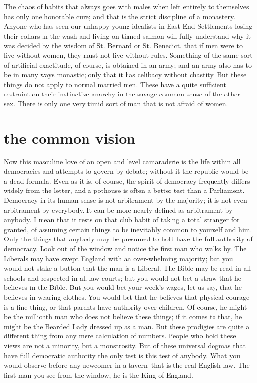 \documentclass[final,10pt,letterpaper,twocolumn,openany]{book}
\begin{document}
The chaos of habits that
always goes with males when left entirely to themselves has only one
honorable cure; and that is the strict discipline of a monastery. Anyone
who has seen our unhappy young idealists in East End Settlements losing
their collars in the wash and living on tinned salmon will fully understand
why it was decided by the wisdom of St. Bernard or St. Benedict, that if
men were to live without women, they must not live without rules.
Something of the same sort of artificial exactitude, of course, is obtained
in an army; and an army also has to be in many ways monastic; only that it
has celibacy without chastity. But these things do not apply to normal
married men. These have a quite sufficient restraint on their instinctive
anarchy in the savage common-sense of the other sex. There is only one
very timid sort of man that is not afraid of women.

\section{the common vision}

    Now this masculine love of an open and level camaraderie is the life
within all democracies and attempts to govern by debate; without it the
republic would be a dead formula. Even as it is, of course, the spirit of
democracy frequently differs widely from the letter, and a pothouse is
often a better test than a Parliament. Democracy in its human sense is not
arbitrament by the majority; it is not even arbitrament by everybody. It can
be more nearly defined as arbitrament by anybody. I mean that it rests on
that club habit of taking a total stranger for granted, of assuming certain
things to be inevitably common to yourself and him. Only the things that
anybody may be presumed to hold have the full authority of democracy.
Look out of the window and notice the first man who walks by. The
Liberals may have swept England with an over-whelming majority; but
you would not stake a button that the man is a Liberal. The Bible may be
read in all schools and respected in all law courts; but you would not bet a
straw that he believes in the Bible. But you would bet your week's wages,
let us say, that he believes in wearing clothes. You would bet that he
believes that physical courage is a fine thing, or that parents have authority
over children. Of course, he might be the millionth man who does not
believe these things; if it comes to that, he might be the Bearded Lady
dressed up as a man. But these prodigies are quite a different thing from
any mere calculation of numbers. People who hold these views are not a
minority, but a monstrosity. But of these universal dogmas that have full
democratic authority the only test is this test of anybody. What you would
observe before any newcomer in a tavern--that is the real English law. The
first man you see from the window, he is the King of England.
\end{document}
